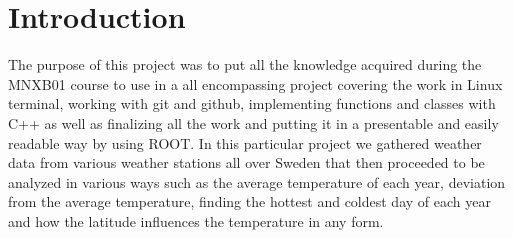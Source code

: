
\section*{Introduction}
The purpose of this project was to put all the knowledge acquired during the MNXB01 course to use in a all encompassing project covering the work in Linux terminal, working with git and github, implementing functions and classes with C++ as well as finalizing all the work and putting  it in a presentable and easily readable way by using ROOT. In this particular project we gathered weather data from various weather stations all over Sweden that then proceeded to be analyzed in various ways such as the average temperature of each year, deviation from the average temperature, finding the hottest and coldest day of each year and how the latitude influences the temperature in any form.   

